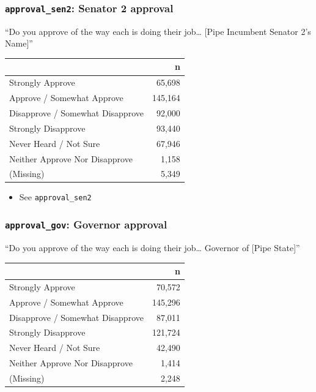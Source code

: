 \documentclass[10pt,article,oneside]{memoir}
\theoremstyle{definition}
\begin{document}
\hypertarget{approval_sen2-senator-2-approval}{%
\subsubsection{\texorpdfstring{\texttt{approval\_sen2}: Senator 2
approval}{approval\_sen2: Senator 2 approval}}\label{approval_sen2-senator-2-approval}}

``Do you approve of the way each is doing their job\ldots{} {[}Pipe
Incumbent Senator 2's Name{]}''

\begin{table}[H]
\centering
\begin{tabular}{lr}
\toprule
 & n\\
\midrule
Strongly Approve & 65,698\\
Approve / Somewhat Approve & 145,164\\
Disapprove / Somewhat Disapprove & 92,000\\
Strongly Disapprove & 93,440\\
Never Heard / Not Sure & 67,946\\
Neither Approve Nor Disapprove & 1,158\\
(Missing) & 5,349\\
\bottomrule
\end{tabular}
\end{table}

\begin{itemize}
\tightlist
\item
  See \texttt{approval\_sen2}
\end{itemize}

\hypertarget{approval_gov-governor-approval}{%
\subsubsection{\texorpdfstring{\texttt{approval\_gov}: Governor
approval}{approval\_gov: Governor approval}}\label{approval_gov-governor-approval}}

``Do you approve of the way each is doing their job\ldots{} Governor of
{[}Pipe State{]}''

\begin{table}[H]
\centering
\begin{tabular}{lr}
\toprule
 & n\\
\midrule
Strongly Approve & 70,572\\
Approve / Somewhat Approve & 145,296\\
Disapprove / Somewhat Disapprove & 87,011\\
Strongly Disapprove & 121,724\\
Never Heard / Not Sure & 42,490\\
Neither Approve Nor Disapprove & 1,414\\
(Missing) & 2,248\\
\bottomrule
\end{tabular}
\end{table}
\end{document}
